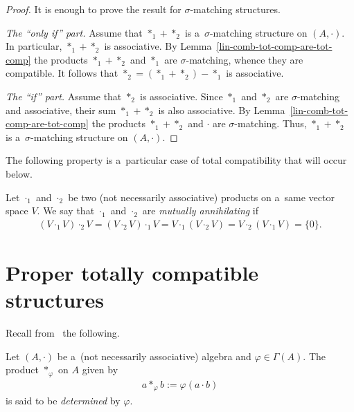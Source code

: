 \documentclass{jonasart}
\newcommand{\G}{\Gamma}
\newcommand{\sg}{\sigma}
\newcommand{\vf}{\varphi}
\begin{document}
	\begin{proof}
		It is enough to prove the result for $\sg$-matching structures.

		\textit{The ``only if'' part.} Assume that $*_1 +*_2$ is a~$\sg$-matching structure on $(A,\cdot)$. In particular, $*_1 +*_2$ is associative. By Lemma~\ref{lin-comb-tot-comp-are-tot-comp} the products $*_1 +*_2$ and $*_1$ are $\sg$-matching, whence they are compatible. It follows that $*_2 =(*_1 +*_2 )-*_1$ is associative.

		\textit{The ``if'' part.} Assume that $*_2$ is associative. Since $*_1$ and $*_2$ are $\sg$-matching and associative, their sum $*_1 +*_2$ is also associative. By Lemma~\ref{lin-comb-tot-comp-are-tot-comp} the products $*_1 +*_2$ and $\cdot$ are $\sg$-matching. Thus, $*_1 +*_2$ is a~$\sg$-matching structure on $(A,\cdot)$.
	\end{proof}

	The following property is a~particular case of total compatibility that will occur below.
	\begin{definition}
		Let $\cdot_1$ and $\cdot_2$ be two (not necessarily associative) products on a~same vector space $V$. We say that $\cdot_1$ and $\cdot_2$ are \textit{mutually annihilating} if
		\begin{align}
			(V\cdot_1 V)\cdot_2 V=(V\cdot_2 V)\cdot_1 V=V\cdot_1 (V\cdot_2 V) = V\cdot_2 (V\cdot_1 V)=\{0\}.
		\end{align}
	\end{definition}
	\section{Proper totally compatible structures}\label{sec-proper-general}

	Recall from~\cite[Definition 2.4]{Khr2024} the following.
	\begin{definition}
		Let $(A,\cdot)$ be a~(not necessarily associative) algebra and $\vf\in\G(A)$. The product $*_\vf$ on $A$ given by
		\begin{align}
			a*_\vf b:=\vf(a\cdot b)
		\end{align}
		is said to be \textit{determined} by $\vf$.
	\end{definition}
\end{document}

